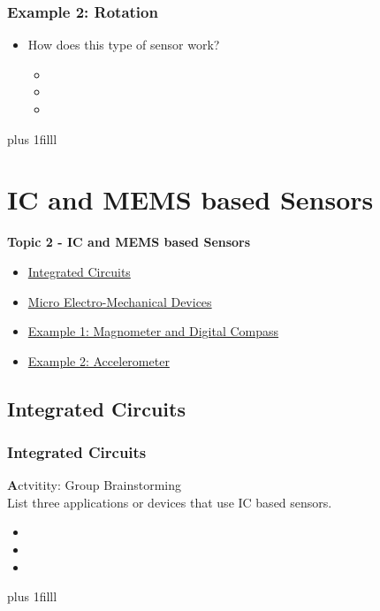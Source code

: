 \documentclass[fleqn]{beamer} %
\newcommand{\sectionIItitle}{IC and MEMS based Sensors}
\newcommand{\sectionIsubsectionIVtitle}{Example 2: Rotation}
\newcommand{\sectionIIsubsectionItitle}{Integrated Circuits}
\newcommand{\sectionIIsubsectionIItitle}{Micro Electro-Mechanical Devices}
\newcommand{\sectionIIsubsectionIIItitle}{Example 1: Magnometer and Digital Compass}
\newcommand{\sectionIIsubsectionIVtitle}{Example 2: Accelerometer}
\newcommand{\btVFill}{\vskip0pt plus 1filll}
\begin{document}
			\begin{frame}
				\frametitle{\sectionIsubsectionIVtitle}
				\begin{itemize}
					\item How does this type of sensor work?
					\begin{itemize}
						\item \vspace{5mm}
						\item \vspace{5mm}
						\item \vspace{5mm}	
					\end{itemize}
				\end{itemize}
				
				\btVFill

			\end{frame}

	
	\section{\sectionIItitle}\label{sectionII}

		\begin{frame}
			\large \textbf{Topic 2 - \sectionIItitle} \vspace{3mm}\\

			\begin{itemize}
				\item \hyperlink{sectionIIsubsectionI}{\sectionIIsubsectionItitle} \vspc %
				\item \hyperlink{sectionIIsubsectionII}{\sectionIIsubsectionIItitle} \vspc %
				\item \hyperlink{sectionIIsubsectionIII}{\sectionIIsubsectionIIItitle} \vspc %
				\item \hyperlink{sectionIIsubsectionIV}{\sectionIIsubsectionIVtitle} \vspc %
			\end{itemize}

		\end{frame}

		\subsection{\sectionIIsubsectionItitle}\label{sectionIIsubsectionI}

			\begin{frame}[label=sectionIIsubsectionI]
				\frametitle{\sectionIIsubsectionItitle}

				{\textbf Actvitity:} Group Brainstorming \\
				List three applications or devices that use IC based sensors.
				\begin{itemize}
					\item
					\item
					\item
				\end{itemize}
				\btVFill	


			\end{frame}
\end{document}

